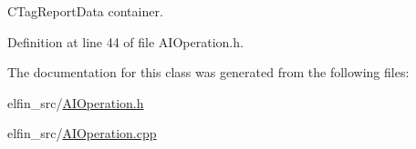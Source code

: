 C\-Tag\-Report\-Data container. 



Definition at line 44 of file A\-I\-Operation.\-h.



The documentation for this class was generated from the following files\-:\begin{DoxyCompactItemize}
\item 
elfin\-\_\-src/\hyperlink{_a_i_operation_8h}{A\-I\-Operation.\-h}\item 
elfin\-\_\-src/\hyperlink{_a_i_operation_8cpp}{A\-I\-Operation.\-cpp}\end{DoxyCompactItemize}
